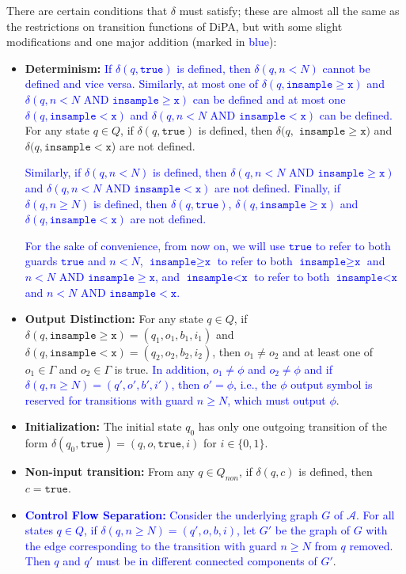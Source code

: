 \documentclass[12pt]{article}
\newcommand{\gguard}{\texttt{insample}\geq \texttt{x}}
\newcommand{\lguard}{\texttt{insample} < \texttt{x}}
\newcommand{\gaguard}{n<N \text{ AND } \texttt{insample} \geq \texttt{x}}
\newcommand{\laguard}{n<N\text{ AND }\texttt{insample} < \texttt{x}}
\theoremstyle{definition}
\begin{document}
There are certain conditions that $\delta$ must satisfy; these are almost all the same as the restrictions on transition functions of DiPA, but with some slight modifications and one major addition (marked in \textcolor{blue}{blue}):
\begin{itemize}
	\item \textbf{Determinism:} 
	\textcolor{blue}{
		If $\delta(q, \texttt{true})$ is defined, then $\delta(q, n<N)$ cannot be defined and vice versa. 
	Similarly, at most one of $\delta(q, \gguard)$ and $\delta(q, \gaguard)$ can be defined and at most one $\delta(q, \lguard)$ and $\delta(q, \laguard)$ can be defined.} For any state $q\in Q$, if $\delta(q, \texttt{true})$ is defined, then $\delta(q,$ $\gguard)$ and $\delta(q, \lguard$) are not defined. 
	
	\textcolor{blue}{Similarly, if $\delta(q, n<N)$ is defined, then $\delta(q, \gaguard)$ and $\delta(q, \laguard)$ are not defined. Finally, if $\delta(q, n\geq N)$ is defined, then $\delta(q, \texttt{true})$, $\delta(q, \gguard)$ and $\delta(q, \lguard)$ are not defined.} 

	\textcolor{blue}{For the sake of convenience, from now on, we will use $\texttt{true}$ to refer to both guards $\texttt{true}$ and $n < N$, $\gguard$ to refer to both $\gguard$ and $\gaguard$, and $\lguard$ to refer to both $\lguard$ and $\laguard$.}

	\item \textbf{Output Distinction:} For any state $q\in Q$, if $\delta(q, \gguard) = (q_1, o_1, b_1, i_1)$ and $\delta(q, \lguard) = (q_2, o_2, b_2, i_2)$, then $o_1\neq o_2$ and at least one of $o_1\in \Gamma$ and $o_2\in \Gamma$ is true. \textcolor{blue}{In addition, $o_1\neq \phi$ and $o_2\neq \phi$ and if $\delta(q, n\geq N) = (q', o', b', i')$, then $o' = \phi$, i.e., the $\phi$ output symbol is reserved for transitions with guard $n\geq N$, which must output $\phi$}.

	\item \textbf{Initialization:} The initial state $q_0$ has only one outgoing transition of the form $\delta(q_0, \texttt{true}) = (q, o, \texttt{true}, i)$ for $i\in \{0, 1\}$.

	\item \textbf{Non-input transition:} From any $q\in Q_{non}$, if $\delta(q, c)$ is defined, then $c=\texttt{true}$.

	\item \textcolor{blue}{\textbf{Control Flow Separation:} Consider the underlying graph $G$ of $\mathcal{A}$. For all states $q\in Q$, if $\delta(q, n\geq N) = (q', o, b, i)$, let $G'$ be the graph of $G$ with the edge corresponding to the transition with guard $n\geq N$ from $q$ removed. Then $q$ and $q'$ must be in different connected components of $G'$}.

\end{itemize}
\end{document}
